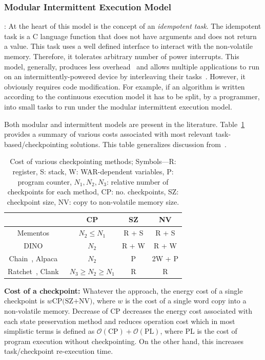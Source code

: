 \subsubsection{Modular Intermittent Execution Model}: At the heart of this model is the concept of an \emph{idempotent task}. The idempotent task is a C language function that does not have arguments and does not return a value. This task uses a well defined interface to interact with the non-volatile memory. Therefore, it tolerates arbitrary number of power interrupts. This model, generally, produces less overhead~\cite{chain} and allows multiple applications to run on an intermittently-powered device by interleaving their tasks~\cite{}. However, it obviously requires code modification. For example, if an algorithm is written according to the continuous execution model it has to be split, by a programmer, into small tasks to run under the modular intermittent execution model.

Both modular and intermittent models are present in the literature. Table~\ref{table:chechpoint_comparison} provides a summary of various costs associated with most relevant task-based/checkpointing solutions. This table generalizes discussion from~\cite[Sec. 2.4]{alpaca}.

\begin{table}
	\centering
	\begin{tabular}{|c|c|c|c|}
		\hline
		{~} & CP & SZ & NV \\
		\hline\hline
		\!\!Mementos~\cite{mementos}\!\! & \!\!$N_2\leq N_1$\!\! & \!\!R + S\!\! & \!\!R + S\!\! \\
		\!\!DINO~\cite{dino}\!\! & $N_2$\!\! & \!\!R + W\!\! & \!\!R + W\!\! \\
		\!\!Chain~\cite{chain}, Alpaca~\cite{alpaca}\!\! & \!\!$N_2$\!\! & P\!\! & \!\!2W + P\!\!\\
		\!\!Ratchet~\cite{ratchet}, Clank~\cite{hicks_isca_2017}\!\! & $N_3\geq N_2\geq N_1$\!\! & \!\!R\!\! & R\!\!\\
		\hline 
	\end{tabular}
	\caption{Cost of various checkpointing methods; Symbols---R: register, S: stack, W: WAR-dependent variables, P: program counter, $N_1, N_2, N_3$: relative number of checkpoints for each method, CP: no. checkpoints, SZ: checkpoint size, NV: copy to non-volatile memory size.}
	\label{table:chechpoint_comparison}
\end{table}

\textbf{Cost of a checkpoint:} Whatever the approach, the energy cost of a single checkpoint is $w\text{CP(SZ+NV)}$, where $w$ is the cost of a single word copy into a non-volatile memory. Decrease of CP decreases the energy cost associated with each state preservation method and reduces operation cost which in most simplistic terms is defined as $\mathcal{O}(\text{CP})+\mathcal{O}(\text{PL})$, where PL is the cost of program execution without checkpointing. On the other hand, this increases task/checkpoint re-execution time. 

